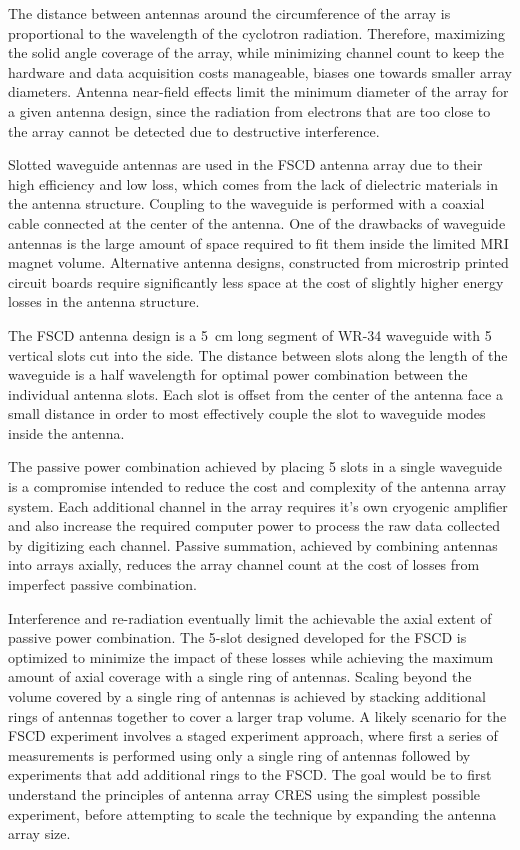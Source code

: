 The distance between antennas around the circumference of the array is proportional to the wavelength of the cyclotron radiation. Therefore, maximizing the solid angle coverage of the array, while minimizing channel count to keep the hardware and data acquisition costs manageable, biases one towards smaller array diameters. Antenna near-field effects limit the minimum diameter of the array for a given antenna design, since the radiation from electrons that are too close to the array cannot be detected due to destructive interference. 

Slotted waveguide antennas are used in the FSCD antenna array due to their high efficiency and low loss, which comes from the lack of dielectric materials in the antenna structure. Coupling to the waveguide is performed with a coaxial cable connected at the center of the antenna. One of the drawbacks of waveguide antennas is the large amount of space required to fit them inside the limited MRI magnet volume. Alternative antenna designs, constructed from microstrip printed circuit boards require significantly less space at the cost of slightly higher energy losses in the antenna structure. 

The FSCD antenna design is a 5~cm long segment of WR-34 waveguide with 5 vertical slots cut into the side. The distance between slots along the length of the waveguide is a half wavelength for optimal power combination between the individual antenna slots. Each slot is offset from the center of the antenna face a small distance in order to most effectively couple the slot to waveguide modes inside the antenna.

The passive power combination achieved by placing 5 slots in a single waveguide is a compromise intended to reduce the cost and complexity of the antenna array system. Each additional channel in the array requires it's own cryogenic amplifier and also increase the required computer power to process the raw data collected by digitizing each channel. Passive summation, achieved by combining antennas into arrays axially, reduces the array channel count at the cost of losses from imperfect passive combination.

Interference and re-radiation eventually limit the achievable the axial extent of passive power combination. The 5-slot designed developed for the FSCD is optimized to minimize the impact of these losses while achieving the maximum amount of axial coverage with a single ring of antennas. Scaling beyond the volume covered by a single ring of antennas is achieved by stacking additional rings of antennas together to cover a larger trap volume. A likely scenario for the FSCD experiment involves a staged experiment approach, where first a series of measurements is performed using only a single ring of antennas followed by experiments that add additional rings to the FSCD. The goal would be to first understand the principles of antenna array CRES using the simplest possible experiment, before attempting to scale the technique by expanding the antenna array size. 

